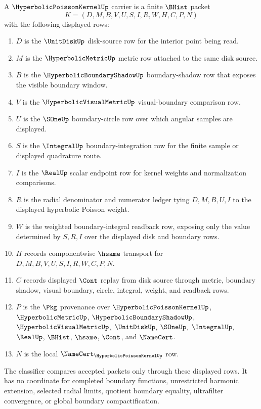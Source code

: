 \begin{definition}
\label{def:hyperbolic-poisson-kernel-carrier}
A $\HyperbolicPoissonKernelUp$ carrier is a finite $\BHist$ packet
$$
K=(D,M,B,V,U,S,I,R,W,H,C,P,N)
$$
with the following displayed rows:
\begin{enumerate}
\item $D$ is the $\UnitDiskUp$ disk-source row for the interior point being read.
\item $M$ is the $\HyperbolicMetricUp$ metric row attached to the same disk source.
\item $B$ is the $\HyperbolicBoundaryShadowUp$ boundary-shadow row that exposes the visible boundary window.
\item $V$ is the $\HyperbolicVisualMetricUp$ visual-boundary comparison row.
\item $U$ is the $\SOneUp$ boundary-circle row over which angular samples are displayed.
\item $S$ is the $\IntegralUp$ boundary-integration row for the finite sample or displayed quadrature route.
\item $I$ is the $\RealUp$ scalar endpoint row for kernel weights and normalization comparisons.
\item $R$ is the radial denominator and numerator ledger tying $D,M,B,U,I$ to the displayed hyperbolic Poisson weight.
\item $W$ is the weighted boundary-integral readback row, exposing only the value determined by $S,R,I$ over the displayed disk and boundary rows.
\item $H$ records componentwise $\hsame$ transport for $D,M,B,V,U,S,I,R,W,C,P,N$.
\item $C$ records displayed $\Cont$ replay from disk source through metric, boundary shadow, visual boundary, circle, integral, weight, and readback rows.
\item $P$ is the $\Pkg$ provenance over $\HyperbolicPoissonKernelUp$, $\HyperbolicMetricUp$, $\HyperbolicBoundaryShadowUp$, $\HyperbolicVisualMetricUp$, $\UnitDiskUp$, $\SOneUp$, $\IntegralUp$, $\RealUp$, $\BHist$, $\hsame$, $\Cont$, and $\NameCert$.
\item $N$ is the local $\NameCert_{\HyperbolicPoissonKernelUp}$ row.
\end{enumerate}
The classifier compares accepted packets only through these displayed rows. It has no coordinate for completed boundary functions, unrestricted harmonic extension, selected radial limits, quotient boundary equality, ultrafilter convergence, or global boundary compactification.
\end{definition}

